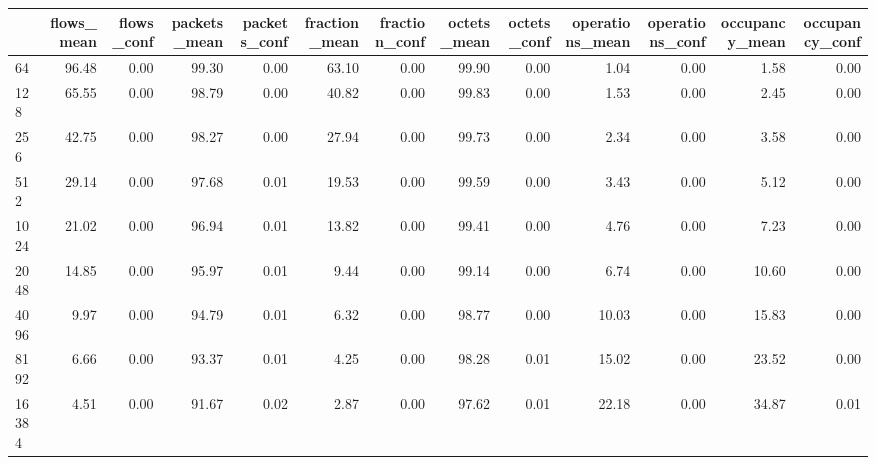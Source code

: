 \begin{tabular}{lrrrrrrrrrrrr}
\toprule
{} &  flows\_mean &  flows\_conf &  packets\_mean &  packets\_conf &  fraction\_mean &  fraction\_conf &  octets\_mean &  octets\_conf &  operations\_mean &  operations\_conf &  occupancy\_mean &  occupancy\_conf \\
\midrule
64         &       96.48 &        0.00 &         99.30 &          0.00 &          63.10 &           0.00 &        99.90 &         0.00 &             1.04 &             0.00 &            1.58 &            0.00 \\
128        &       65.55 &        0.00 &         98.79 &          0.00 &          40.82 &           0.00 &        99.83 &         0.00 &             1.53 &             0.00 &            2.45 &            0.00 \\
256        &       42.75 &        0.00 &         98.27 &          0.00 &          27.94 &           0.00 &        99.73 &         0.00 &             2.34 &             0.00 &            3.58 &            0.00 \\
512        &       29.14 &        0.00 &         97.68 &          0.01 &          19.53 &           0.00 &        99.59 &         0.00 &             3.43 &             0.00 &            5.12 &            0.00 \\
1024       &       21.02 &        0.00 &         96.94 &          0.01 &          13.82 &           0.00 &        99.41 &         0.00 &             4.76 &             0.00 &            7.23 &            0.00 \\
2048       &       14.85 &        0.00 &         95.97 &          0.01 &           9.44 &           0.00 &        99.14 &         0.00 &             6.74 &             0.00 &           10.60 &            0.00 \\
4096       &        9.97 &        0.00 &         94.79 &          0.01 &           6.32 &           0.00 &        98.77 &         0.00 &            10.03 &             0.00 &           15.83 &            0.00 \\
8192       &        6.66 &        0.00 &         93.37 &          0.01 &           4.25 &           0.00 &        98.28 &         0.01 &            15.02 &             0.00 &           23.52 &            0.00 \\
16384      &        4.51 &        0.00 &         91.67 &          0.02 &           2.87 &           0.00 &        97.62 &         0.01 &            22.18 &             0.00 &           34.87 &            0.01 \\

\end{tabular}
